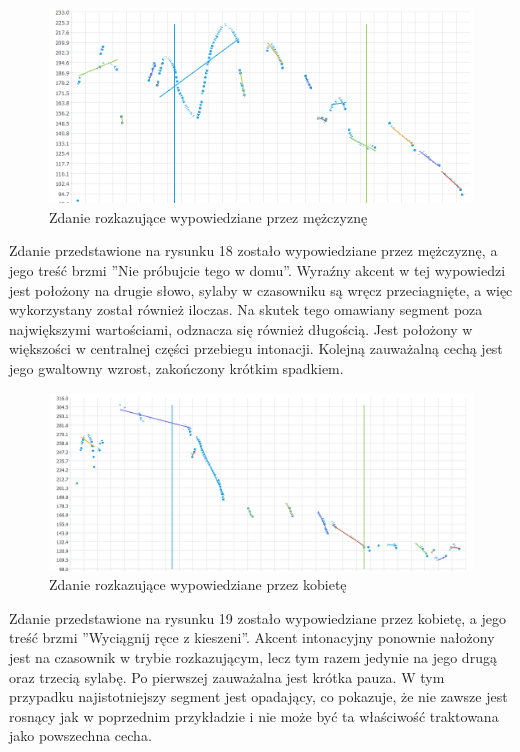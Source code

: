 \documentclass[a4paper,12 pt]{article}
\begin{document}
 \FloatBarrier
\begin{figure}[h]
\centering
\includegraphics[scale=0.7]{rozkaz_dom.png}
\caption{Zdanie rozkazujące wypowiedziane przez mężczyznę}
\end{figure}
\FloatBarrier
Zdanie przedstawione na rysunku 18 zostało wypowiedziane przez mężczyznę, a jego treść brzmi ''Nie próbujcie tego w domu''. Wyraźny akcent w tej wypowiedzi jest położony na drugie słowo, sylaby w czasowniku są wręcz przeciagnięte, a więc wykorzystany został również iloczas. Na skutek tego omawiany segment poza największymi wartościami, odznacza się również długością. Jest położony w większości w centralnej części przebiegu intonacji. Kolejną zauważalną cechą jest jego gwaltowny wzrost, zakończony krótkim spadkiem. 
 \FloatBarrier
\begin{figure}[h]
\centering
\includegraphics[scale=0.7]{rozkaz_rece_kobieta.png}
\caption{Zdanie rozkazujące wypowiedziane przez kobietę}
\end{figure}
\FloatBarrier
Zdanie przedstawione na rysunku 19 zostało wypowiedziane przez kobietę, a jego treść brzmi ''Wyciągnij ręce z kieszeni''. Akcent intonacyjny ponownie nałożony jest na czasownik w trybie rozkazującym, lecz tym razem jedynie na jego drugą oraz trzecią sylabę. Po pierwszej zauważalna jest krótka pauza.
W tym przypadku najistotniejszy segment jest opadający, co pokazuje, że nie zawsze jest rosnący jak w poprzednim przykładzie i nie może być ta właściwość traktowana jako powszechna cecha.
\end{document}
